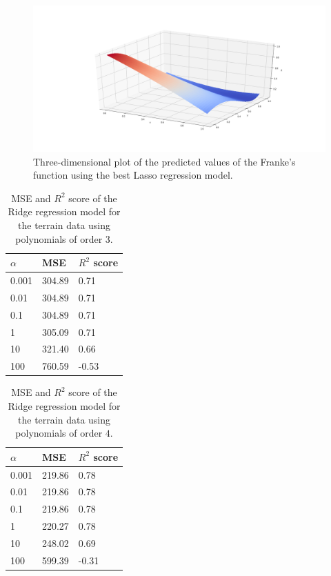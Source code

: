 \documentclass [11pt]{article}
\begin{document}
\begin{figure}[H]
\centering
\includegraphics[width=1\textwidth]{figures/LassoFranke.png}
        \caption{Three-dimensional plot of the predicted values of the Franke’s function using the best Lasso regression model.}
        \label{fig:LassoFranke}
\end{figure}
\begin{table}[H]
\centering
\begin{tabular}{lll}
\hline
$\alpha$ & MSE    & $R^{2}$ score \\ \hline
0.001     & 304.89 & 0.71          \\
0.01      & 304.89 & 0.71          \\
0.1       & 304.89 & 0.71         \\
1         & 305.09 & 0.71         \\
10        & 321.40 & 0.66          \\
100       & 760.59 & -0.53          \\ \hline
\end{tabular}
\caption{MSE and $R^{2}$ score of the Ridge regression model for the terrain data using polynomials of order $3$.}
\label{tab:ridge3Terrain}
\end{table}

\begin{table}[H]
\centering
\begin{tabular}{lll}
\hline
$\alpha$ & MSE    & $R^{2}$ score \\ \hline
0.001     & 219.86 & 0.78          \\
0.01      & 219.86 & 0.78          \\
0.1       & 219.86 & 0.78         \\
1         & 220.27 & 0.78          \\
10        & 248.02 & 0.69          \\
100       & 599.39 & -0.31          \\ \hline
\end{tabular}
\caption{MSE and $R^{2}$ score of the Ridge regression model for the terrain data using polynomials of order $4$.}
\label{tab:ridge4Terrain}
\end{table}
\end{document}
